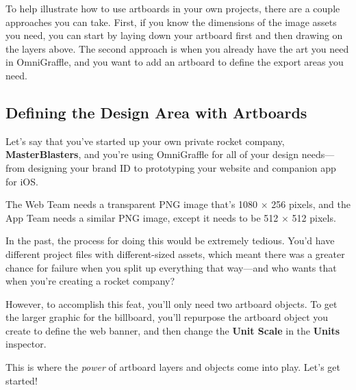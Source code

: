 \documentclass[../main.tex]{subfiles}
\begin{document}
To help illustrate how to use artboards in your own projects, there are a couple approaches you
can take. First, if you know the dimensions of the image assets you need, you can start by
laying down your artboard first and then drawing on the layers above. The second approach is
when you already have the art you need in OmniGraffle, and you want to add an artboard to
define the export areas you need.

\subsection{Defining the Design Area with Artboards}

Let's say that you've started up your own private rocket company, \textbf{MasterBlasters}, and
you're using OmniGraffle for all of your design needs---from designing your brand ID to
prototyping your website and companion app for iOS.

The Web Team needs a transparent PNG image that's 1080 $\times$ 256 pixels, and the App Team
needs a similar PNG image, except it needs to be 512 $\times$ 512 pixels.

In the past, the process for doing this would be extremely tedious. You'd have different project
files with different-sized assets, which meant there was a greater chance for failure when you
split up everything that way---and who wants that when you're creating a rocket company?

However, to accomplish this feat, you'll only need two artboard objects. To get the larger
graphic for the billboard, you'll repurpose the artboard object you create to define the web
banner, and then change the \textbf{Unit Scale} in the \textbf{Units} inspector.

This is where the \textit{power} of artboard layers and objects come into play. Let's get
started!
\end{document}
